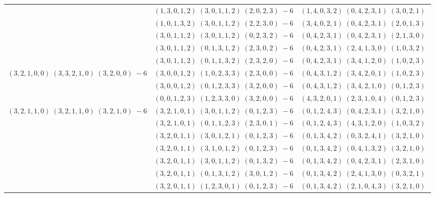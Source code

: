 \documentclass[11pt]{article}
\begin{document}
\begin{longtable}[l]{|c|c|c|}
 \cline{2-3} 
 & $(1 ,3 ,0 ,1 ,2) \;(3 ,0 ,1 ,1 ,2) \;(2 ,0 ,2 ,3) \;-6$ & $(1 ,4 ,0 ,3 ,2) \;(0 ,4 ,2 ,3 ,1) \;(3 ,0 ,2 ,1) \;$\\ 
 \cline{2-3} 
 & $(1 ,0 ,1 ,3 ,2) \;(3 ,0 ,1 ,1 ,2) \;(2 ,2 ,3 ,0) \;-6$ & $(3 ,4 ,0 ,2 ,1) \;(0 ,4 ,2 ,3 ,1) \;(2 ,0 ,1 ,3) \;$\\ 
 \cline{2-3} 
 & $(3 ,0 ,1 ,1 ,2) \;(3 ,0 ,1 ,1 ,2) \;(0 ,2 ,3 ,2) \;-6$ & $(0 ,4 ,2 ,3 ,1) \;(0 ,4 ,2 ,3 ,1) \;(2 ,1 ,3 ,0) \;$\\ 
 \cline{2-3} 
 & $(3 ,0 ,1 ,1 ,2) \;(0 ,1 ,3 ,1 ,2) \;(2 ,3 ,0 ,2) \;-6$ & $(0 ,4 ,2 ,3 ,1) \;(2 ,4 ,1 ,3 ,0) \;(1 ,0 ,3 ,2) \;$\\ 
 \cline{2-3} 
 & $(3 ,0 ,1 ,1 ,2) \;(0 ,1 ,1 ,3 ,2) \;(2 ,3 ,2 ,0) \;-6$ & $(0 ,4 ,2 ,3 ,1) \;(3 ,4 ,1 ,2 ,0) \;(1 ,0 ,2 ,3) \;$\\ \hline\multirow[t]{3}{*}{ $(3 ,2 ,1 ,0 ,0) \;(3 ,3 ,2 ,1 ,0) \;(3 ,2 ,0 ,0) \;-6$ }  & $(3 ,0 ,0 ,1 ,2) \;(1 ,0 ,2 ,3 ,3) \;(2 ,3 ,0 ,0) \;-6$ & $(0 ,4 ,3 ,1 ,2) \;(3 ,4 ,2 ,0 ,1) \;(1 ,0 ,2 ,3) \;$\\ 
 \cline{2-3} 
 & $(3 ,0 ,0 ,1 ,2) \;(0 ,1 ,2 ,3 ,3) \;(3 ,2 ,0 ,0) \;-6$ & $(0 ,4 ,3 ,1 ,2) \;(3 ,4 ,2 ,1 ,0) \;(0 ,1 ,2 ,3) \;$\\ 
 \cline{2-3} 
 & $(0 ,0 ,1 ,2 ,3) \;(1 ,2 ,3 ,3 ,0) \;(3 ,2 ,0 ,0) \;-6$ & $(4 ,3 ,2 ,0 ,1) \;(2 ,3 ,1 ,0 ,4) \;(0 ,1 ,2 ,3) \;$\\ \hline\multirow[t]{82}{*}{ $(3 ,2 ,1 ,1 ,0) \;(3 ,2 ,1 ,1 ,0) \;(3 ,2 ,1 ,0) \;-6$ }  & $(3 ,2 ,1 ,0 ,1) \;(3 ,0 ,1 ,1 ,2) \;(0 ,1 ,2 ,3) \;-6$ & $(0 ,1 ,2 ,4 ,3) \;(0 ,4 ,2 ,3 ,1) \;(3 ,2 ,1 ,0) \;$\\ 
 \cline{2-3} 
 & $(3 ,2 ,1 ,0 ,1) \;(0 ,1 ,1 ,2 ,3) \;(2 ,3 ,0 ,1) \;-6$ & $(0 ,1 ,2 ,4 ,3) \;(4 ,3 ,1 ,2 ,0) \;(1 ,0 ,3 ,2) \;$\\ 
 \cline{2-3} 
 & $(3 ,2 ,0 ,1 ,1) \;(3 ,0 ,1 ,2 ,1) \;(0 ,1 ,2 ,3) \;-6$ & $(0 ,1 ,3 ,4 ,2) \;(0 ,3 ,2 ,4 ,1) \;(3 ,2 ,1 ,0) \;$\\ 
 \cline{2-3} 
 & $(3 ,2 ,0 ,1 ,1) \;(3 ,1 ,0 ,1 ,2) \;(0 ,1 ,2 ,3) \;-6$ & $(0 ,1 ,3 ,4 ,2) \;(0 ,4 ,1 ,3 ,2) \;(3 ,2 ,1 ,0) \;$\\ 
 \cline{2-3} 
 & $(3 ,2 ,0 ,1 ,1) \;(3 ,0 ,1 ,1 ,2) \;(0 ,1 ,3 ,2) \;-6$ & $(0 ,1 ,3 ,4 ,2) \;(0 ,4 ,2 ,3 ,1) \;(2 ,3 ,1 ,0) \;$\\ 
 \cline{2-3} 
 & $(3 ,2 ,0 ,1 ,1) \;(0 ,1 ,3 ,1 ,2) \;(3 ,0 ,1 ,2) \;-6$ & $(0 ,1 ,3 ,4 ,2) \;(2 ,4 ,1 ,3 ,0) \;(0 ,3 ,2 ,1) \;$\\ 
 \cline{2-3} 
 & $(3 ,2 ,0 ,1 ,1) \;(1 ,2 ,3 ,0 ,1) \;(0 ,1 ,2 ,3) \;-6$ & $(0 ,1 ,3 ,4 ,2) \;(2 ,1 ,0 ,4 ,3) \;(3 ,2 ,1 ,0) \;$\\ 

\end{longtable}
\end{document}
